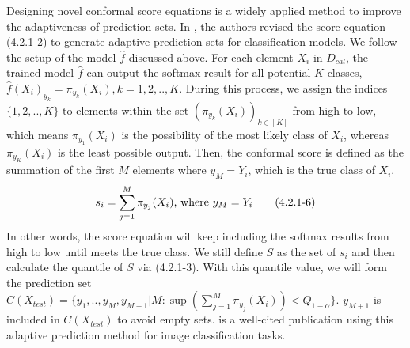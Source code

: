 \noindent Designing novel conformal score equations is a widely applied method to improve the adaptiveness of prediction sets. In \cite{romano2020classification}, the authors revised the score equation (4.2.1-2) to generate adaptive prediction sets for classification models.  We follow the setup of the model $\hat{f}$ discussed above. For each element $X_i$ in $D_{cal}$, the trained model $\hat{f}$ can output the softmax result for all potential $K$ classes, $\hat{f}(X_i)_{y_k}=\pi_{y_k}(X_i), k=1,2,..,K$.  During this process, we assign the indices $\{1,2,.., K\}$ to elements within the set $(\pi_{y_k}(X_i))_{k\in[K]}$ from high to low, which means $\pi_{y_1}(X_i)$ is the possibility of the most likely class of $X_i$, whereas $\pi_{y_K}(X_i)$ is the least possible output.  Then, the conformal score is defined as the summation of the first $M$ elements where $y_M=Y_i$, which is the true class of $X_i$. 
\begin{equation}
s_i = \sum_{j=1}^M \pi_{y_j}(X_i)\text{, where } y_M=Y_i\\\tag{4.2.1-6}
\end{equation}
In other words, the score equation will keep including the softmax results from high to low until meets the true class. We still define $S$ as the set of $s_i$ and then calculate the quantile of $S$ via (4.2.1-3). With this quantile value, we will form the prediction set $C(X_{test})=\{y_1,..,y_M,y_{M+1}|M:\sup(\sum_{j=1}^M \pi_{y_j}(X_i))<Q_{1-\alpha}\}$. $y_{M+1}$ is included in  $C(X_{test})$ to avoid empty sets. \cite{angelopoulos2020uncertainty} is a well-cited publication using this adaptive prediction method for image classification tasks.\\

